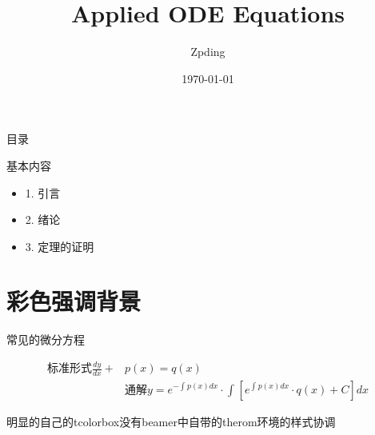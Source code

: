 \documentclass[10pt]{beamer}
\title{Applied ODE Equations}
\author{Zpding}
\date{\today}
\begin{document}
\begin{frame}[plain]
    \titlepage
  \end{frame}
  
\begin{frame}{目录}
    \tableofcontents
\end{frame}

\begin{frame}
    \kaishu
    基本内容\par 
    \begin{itemize}
        \item 1. 引言
        \item 2. 绪论
        \item 3. 定理的证明
    \end{itemize}
\end{frame}

\section{彩色强调背景}
\begin{frame}
    常见的微分方程
    \begin{tcolorbox}[colback=blue!5!white,colframe=blue!75!black,title=ODES Ordinary Form]
        \begin{align}
            \mbox{标准形式}\frac{dy}{dx} + &p(x)=q(x)\nonumber\\
            &\mbox{通解}y=e^{-\int_{}^{}{p(x)dx}}\cdot\int_{}^{}{[e^{\int_{}^{}{p(x) dx}} \cdot q(x)+C] dx}
      \end{align}
    \end{tcolorbox}
    \textcolor{blue!70}{
        \kaishu
        \fontsize{7pt}{2pt}
    明显的自己的tcolorbox没有beamer中自带的therom环境的样式协调
    }
\end{frame}
\end{document}
